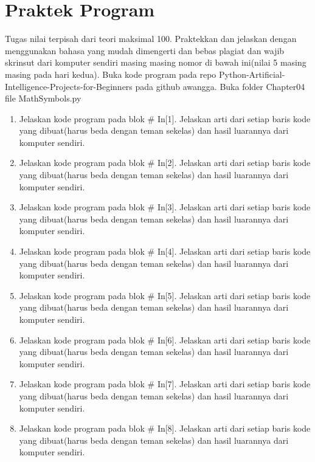 \section{Praktek Program}
Tugas nilai terpisah dari teori maksimal 100. Praktekkan dan jelaskan dengan menggunakan bahasa yang mudah dimengerti dan bebas plagiat dan wajib skrinsut dari komputer sendiri masing masing nomor di bawah ini(nilai 5 masing masing pada hari kedua). Buka kode program pada repo Python-Artificial-Intelligence-Projects-for-Beginners pada github awangga. Buka folder Chapter04 file MathSymbols.py

\begin{enumerate}
\item Jelaskan kode program pada blok # In[1]. Jelaskan arti dari setiap baris kode yang dibuat(harus beda dengan teman sekelas) dan hasil luarannya dari komputer sendiri.

\item Jelaskan kode program pada blok # In[2]. Jelaskan arti dari setiap baris kode yang dibuat(harus beda dengan teman sekelas) dan hasil luarannya dari komputer sendiri.

\item Jelaskan kode program pada blok # In[3]. Jelaskan arti dari setiap baris kode yang dibuat(harus beda dengan teman sekelas) dan hasil luarannya dari komputer sendiri.

\item Jelaskan kode program pada blok # In[4]. Jelaskan arti dari setiap baris kode yang dibuat(harus beda dengan teman sekelas) dan hasil luarannya dari komputer sendiri.

\item Jelaskan kode program pada blok # In[5]. Jelaskan arti dari setiap baris kode yang dibuat(harus beda dengan teman sekelas) dan hasil luarannya dari komputer sendiri.

\item Jelaskan kode program pada blok # In[6]. Jelaskan arti dari setiap baris kode yang dibuat(harus beda dengan teman sekelas) dan hasil luarannya dari komputer sendiri.

\item Jelaskan kode program pada blok # In[7]. Jelaskan arti dari setiap baris kode yang dibuat(harus beda dengan teman sekelas) dan hasil luarannya dari komputer sendiri.

\item Jelaskan kode program pada blok # In[8]. Jelaskan arti dari setiap baris kode yang dibuat(harus beda dengan teman sekelas) dan hasil luarannya dari komputer sendiri.


\end{enumerate}
